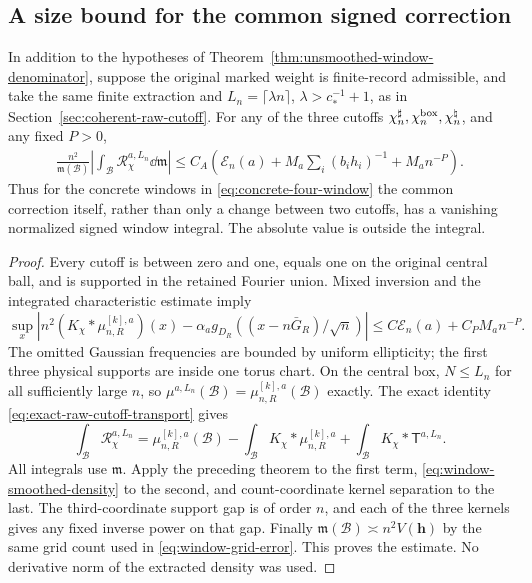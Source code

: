 \subsection{A size bound for the common signed correction}
\begin{theorem}
\label{thm:averaged-common-raw-remainder}
In addition to the hypotheses of
Theorem~\ref{thm:unsmoothed-window-denominator}, suppose the original
marked weight is finite-record admissible, and take the same finite
extraction and $L_n=\lceil\lambda n\rceil$, $\lambda>c_*^{-1}+1$,
as in Section~\ref{sec:coherent-raw-cutoff}. For any of the three
cutoffs $\chi_n^\sharp,\chi_n^{\rm box},\chi_n^\natural$, and any
fixed $P>0$,
\begin{align}
 \frac{n^2}{\mathfrak m(\mathcal B)}
 \left|\int_{\mathcal B}\mathcal R_\chi^{a,L_n}\dd\mathfrak m\right|
 \le C_A\left(\mathcal E_n(a)+M_a\sum_i(b_ih_i)^{-1}
                                      +M_an^{-P}\right).
 \label{eq:averaged-common-raw-remainder}
\end{align}
Thus for the concrete windows in \eqref{eq:concrete-four-window} the
common correction itself, rather than only a change between two
cutoffs, has a vanishing normalized signed window integral.
The absolute value is outside the integral.
\end{theorem}
\begin{proof}
Every cutoff is between zero and one, equals one on the original
central ball, and is supported in the retained Fourier union.
Mixed inversion and the integrated characteristic estimate imply
\begin{equation}\label{eq:window-smoothed-density}
 \sup_x\left|n^2(K_\chi*\mu_{n,R}^{[k],a})(x)
          -\alpha_ag_{D_R}((x-n\bar G_R)/\sqrt n)\right|
       \le C\mathcal E_n(a)+C_P M_an^{-P}.
\end{equation}
The omitted Gaussian frequencies are bounded by uniform ellipticity;
the first three physical supports are inside one torus chart.
On the central box, $N\le L_n$ for all sufficiently large $n$, so
$\mu^{a,L_n}(\mathcal B)=\mu_{n,R}^{[k],a}(\mathcal B)$ exactly.
The exact identity \eqref{eq:exact-raw-cutoff-transport} gives
\[
 \int_{\mathcal B}\mathcal R_\chi^{a,L_n}
  =\mu_{n,R}^{[k],a}(\mathcal B)
     -\int_{\mathcal B}K_\chi*\mu_{n,R}^{[k],a}
     +\int_{\mathcal B}K_\chi*\mathsf T^{a,L_n}.
\]
All integrals use $\mathfrak m$. Apply the preceding theorem to the
first term, \eqref{eq:window-smoothed-density} to the second, and
count-coordinate kernel separation to the last. The third-coordinate
support gap is of order $n$, and each of the three kernels gives
any fixed inverse power on that gap. Finally
$\mathfrak m(\mathcal B)\asymp n^2V(\mathbf h)$ by the same grid
count used in \eqref{eq:window-grid-error}. This proves the estimate.
No derivative norm of the extracted density was used.
\end{proof}

